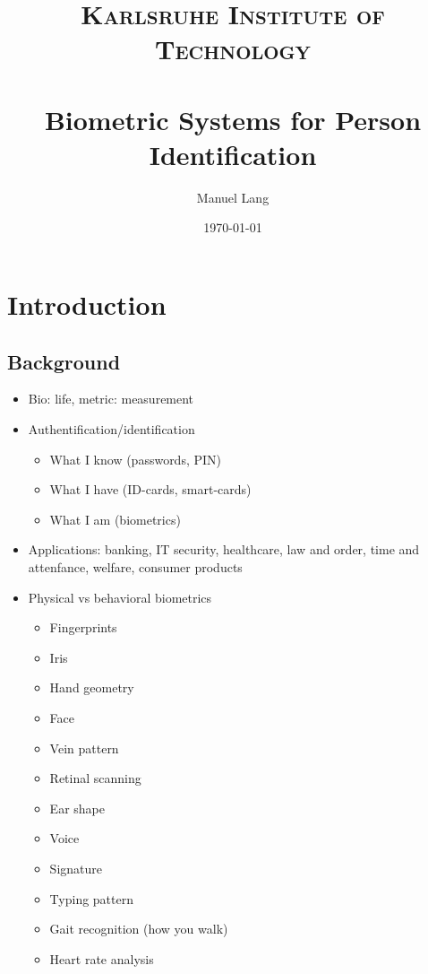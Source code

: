 \documentclass[paper=a4, fontsize=11pt]{scrartcl} %
\title{	
\normalfont \normalsize 
\textsc{Karlsruhe Institute of Technology} \\ [25pt] %
\horrule{0.5pt} \\[0.4cm] %
\huge Biometric Systems for Person Identification %
\horrule{2pt} \\[0.5cm] %
}
\author{Manuel Lang} %
\date{\normalsize\today} %
\numberwithin{equation}{section} %
\numberwithin{figure}{section} %
\numberwithin{table}{section} %
\begin{document}
\maketitle %
\newpage
\tableofcontents
\newpage

\section{Introduction}

\subsection{Background}

\begin{itemize}
\item Bio: life, metric: measurement
\item Authentification/identification
\begin{itemize}
\item What I know (passwords, PIN)
\item What I have (ID-cards, smart-cards)
\item What I am (biometrics)
\end{itemize}
\item Applications: banking, IT security, healthcare, law and order, time and attenfance, welfare, consumer products
\item Physical vs behavioral biometrics\\ 
\begin{varwidth}[t]{.5\textwidth}
\begin{itemize}
\item Fingerprints
\item Iris
\item Hand geometry
\item Face
\item Vein pattern
\item Retinal scanning
\item Ear shape
\end{itemize}
\end{varwidth}%
\hspace{4em}%
\begin{varwidth}[t]{.5\textwidth}
\begin{itemize}
\item Voice
\item Signature
\item Typing pattern
\item Gait recognition (how you walk)
\item Heart rate analysis
\end{itemize}
\end{varwidth}
\end{itemize}
\end{document}
